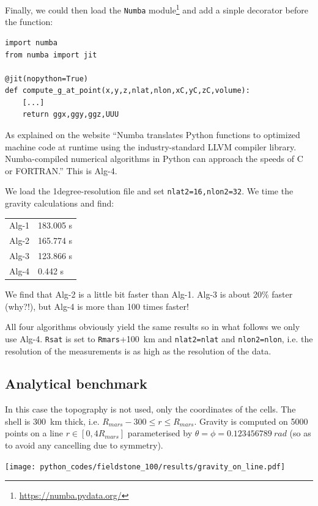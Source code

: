 Finally, we could then load the \lstinline{Numba} module\footnote{\url{https://numba.pydata.org/}} 
and add a sinple decorator before the 
function:
\begin{lstlisting}
import numba
from numba import jit

@jit(nopython=True)
def compute_g_at_point(x,y,z,nlat,nlon,xC,yC,zC,volume):
    [...]
    return ggx,ggy,ggz,UUU
\end{lstlisting}
As explained on the website ``Numba translates Python functions to optimized machine code at runtime using 
the industry-standard LLVM compiler library. Numba-compiled numerical algorithms in Python 
can approach the speeds of C or FORTRAN.''
This is Alg-4.

We load the 1degree-resolution file and set \lstinline{nlat2=16,nlon2=32}. We time the 
gravity calculations and find:
\begin{center}
\begin{tabular}{ll}
\hline
Alg-1 & 183.005 s \\
Alg-2 & 165.774 s \\ 
Alg-3 & 123.866 s \\
Alg-4 & 0.442 s \\
\hline
\end{tabular}
\end{center}
We find that Alg-2 is a little bit faster than Alg-1. Alg-3 is about 20\% faster (why?!), 
but Alg-4 is more than 100 times faster!  

All four algorithms obviously yield the same results so in what follows we 
only use Alg-4. \lstinline{Rsat} is set to \lstinline{Rmars}+100~km and \lstinline{nlat2=nlat}
and \lstinline{nlon2=nlon}, i.e. the resolution of the measurements is as high as the 
resolution of the data.

\newpage
\subsection*{Analytical benchmark}

In this case the topography is not used, only the coordinates of the cells. 
The shell is 300~\si{\km} thick, i.e. $R_{mars}-300 \le r \le R_{mars}$.
Gravity is computed on 5000 points on a line $r\in[0,4R_{mars}]$ parameterised by 
$\theta=\phi=0.123456789~\si{rad}$ (so as to avoid any cancelling due to symmetry).

\begin{center}
\texttt{[image: python\_codes/fieldstone\_100/results/gravity\_on\_line.pdf]}
\end{center}

